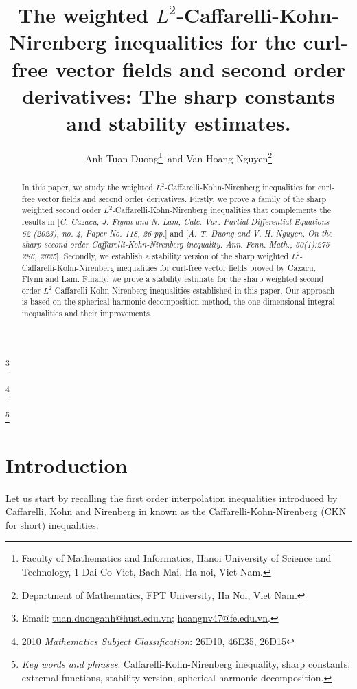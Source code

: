 \documentclass[a4paper,12pt]{article}
\title{The weighted $L^2$-Caffarelli-Kohn-Nirenberg inequalities for the curl-free vector fields and second order derivatives: The sharp constants and stability estimates.}%
\author{Anh Tuan Duong\footnote{Faculty of  Mathematics and Informatics, Hanoi University of Science and Technology, 1 Dai Co Viet, Bach Mai, Ha noi, Viet Nam.}\, and Van Hoang Nguyen\footnote{Department of Mathematics, FPT University, Ha Noi, Viet Nam.} 
}
\theoremstyle{plain}
\theoremstyle{definition}
\theoremstyle{remark}
\renewcommand{\thefootnote}{\arabic{footnote}}
\numberwithin{equation}{section}
\begin{document}
\maketitle


\renewcommand{\thefootnote}{}

\footnote{Email: \href{mailto: Anh Tuan Duong<tuan.duonganh@hust.edu.vn>}{tuan.duonganh@hust.edu.vn}; \href{mailto:Van Hoang Nguyen <hoangnv47@fe.edu.vn>}{hoangnv47@fe.edu.vn}.}

\footnote{2010 \emph{Mathematics Subject Classification\text}: 26D10, 46E35, 26D15}

\footnote{\emph{Key words and phrases\text}: Caffarelli-Kohn-Nirenberg inequality, sharp constants, extremal functions, stability version, spherical harmonic decomposition.}

\renewcommand{\thefootnote}{\arabic{footnote}}
\setcounter{footnote}{0}

\begin{abstract}
In this paper, we study the weighted $L^2$-Caffarelli-Kohn-Nirenberg inequalities for curl-free vector fields and second order derivatives. Firstly, we prove a family of the sharp weighted second order $L^2$-Caffarelli-Kohn-Nirenberg inequalities that complements the results in [{\it C. Cazacu, J. Flynn and N. Lam,
	Calc. Var. Partial Differential Equations 62 (2023), no. 4, Paper No. 118, 26 pp.}] and [{\it A. T. Duong and V. H. Nguyen, On the sharp second order Caffarelli-Kohn-Nirenberg
inequality. Ann. Fenn. Math., 50(1):275--286, 2025}]. Secondly, we establish a stability version of the sharp weighted $L^2$-Caffarelli-Kohn-Nirenberg inequalities for curl-free vector fields proved by Cazacu, Flynn and Lam. Finally, we prove a stability estimate for the sharp weighted second order $L^2$-Caffarelli-Kohn-Nirenberg inequalities established in this paper. Our approach is based on the spherical harmonic decomposition method, the one dimensional integral inequalities and their improvements.
\end{abstract}

\section{Introduction}
Let us start by recalling the first order interpolation inequalities introduced by Caffarelli, Kohn and Nirenberg in \cite{1stCKN} known as the Caffarelli-Kohn-Nirenberg (CKN for short) inequalities.
\end{document}
